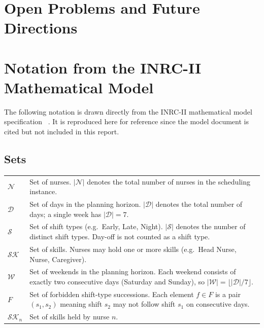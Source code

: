 \documentclass[11pt]{article}
\begin{document}
\section{Open Problems and Future Directions}


\appendix

\section{Notation from the INRC-II Mathematical Model}
\label{app:notation}

The following notation is drawn directly from the INRC-II mathematical
model specification ~\cite{ceschia2015inrc2}. It is reproduced here for
reference since the model document is cited but not included in this
report.

\subsection*{Sets}

\begin{tabular}{@{}lp{10cm}@{}}
  $\mathcal{N}$ &
    Set of nurses. $|\mathcal{N}|$ denotes the total number of
    nurses in the scheduling instance. \\[6pt]

  $\mathcal{D}$ &
    Set of days in the planning horizon. $|\mathcal{D}|$ denotes the
    total number of days; a single week has $|\mathcal{D}| = 7$. \\[6pt]

  $\mathcal{S}$ &
    Set of shift types (e.g.\ Early, Late, Night). $|\mathcal{S}|$
    denotes the number of distinct shift types. Day-off is not
    counted as a shift type. \\[6pt]

  $\mathcal{SK}$ &
    Set of skills. Nurses may hold one or more skills (e.g.\
    Head Nurse, Nurse, Caregiver). \\[6pt]

  $\mathcal{W}$ &
    Set of weekends in the planning horizon. Each weekend consists of
    exactly two consecutive days (Saturday and Sunday), so
    $|\mathcal{W}| = \lfloor |\mathcal{D}| / 7 \rfloor$. \\[6pt]

  $F$ &
    Set of forbidden shift-type successions. Each element $f \in F$
    is a pair $(s_1, s_2)$ meaning shift $s_2$ may not follow shift
    $s_1$ on consecutive days. \\[6pt]

  $\mathcal{SK}_n$ &
    Set of skills held by nurse $n$. \\
\end{tabular}
\end{document}
